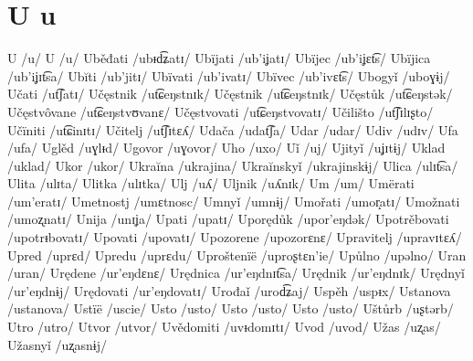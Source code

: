\chapter{U u}

U /u/
U /u/
Uběđati /ubᵻd͡ʑatɪ/
Ubïjati /ub’iʝatɪ/
Ubïjec /ub’iʝɛt͡s/
Ubïjica /ub’iʝɪt͡sa/
Ubĭti /ub’jitɪ/
Ubïvati /ub’ivatɪ/
Ubïvec /ub’ivɛt͡s/
Ubogyǐ /uboɣɨj/
Učati /ut͡ʃatɪ/
Učęstnik /ut͡ɕeŋstnɪk/
Učęstnik /ut͡ɕeŋstnɪk/
Učęstůk /ut͡ɕeŋstək/
Učęstvôvane /ut͡ɕeŋstvʊvanɛ/
Učęstvovati /ut͡ɕeŋstvovatɪ/
Učilišto /ut͡ʃɪlɪʂto/
Učïniti /ut͡ɕinɪtɪ/
Učitelj /ut͡ʃɪtɛʎ/
Udača /udat͡ʃa/
Udar /udar/
Udiv /udɪv/
Ufa /ufa/
Uglěd /uɣlᵻd/
Ugovor /uɣovor/
Uho /uxo/
Uǐ /uj/
Ujityǐ /uʝɪtɨj/
Uklad /uklad/
Ukor /ukor/
Ukraĭna /ukrajina/
Ukraĭnskyǐ /ukrajinskɨj/
Ulica /ulɪt͡sa/
Ulita /ulɪta/
Ulitka /ulɪtka/
Ulj /uʎ/
Uljnik /uʎnɪk/
Um /um/
Umërati /um’eratɪ/
Umetnostj /umɛtnosc/
Umnyǐ /umnɨj/
Umořati /umor̝atɪ/
Umožnati /umoʐnatɪ/
Unija /unɪʝa/
Upati /upatɪ/
Uporędůk /upor’eŋdək/
Upotrěbovati /upotrᵻbovatɪ/
Upovati /upovatɪ/
Upozorene /upozorɛnɛ/
Upravitelj /upravɪtɛʎ/
Upred /uprɛd/
Upredu /uprɛdu/
Uproštenïë /uproʂtɛn’ie/
Upůlno /upəlno/
Uran /uran/
Urędene /ur’eŋdɛnɛ/
Urędnica /ur’eŋdnɪt͡sa/
Urędnik /ur’eŋdnɪk/
Urędnyǐ /ur’eŋdnɨj/
Urędovati /ur’eŋdovatɪ/
Urođaǐ /urod͡ʑaj/
Uspěh /uspᵻx/
Ustanova /ustanova/
Ustïë /uscie/
Usto /usto/
Usto /usto/
Usto /usto/
Uštůrb /uʂtərb/
Utro /utro/
Utvor /utvor/
Uvědomiti /uvᵻdomɪtɪ/
Uvod /uvod/
Užas /uʐas/
Užasnyǐ /uʐasnɨj/